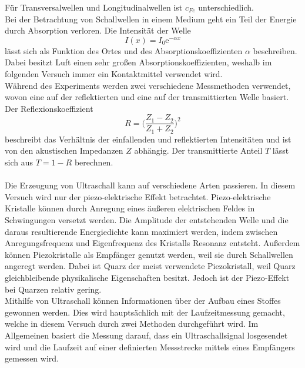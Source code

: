 Für Transversalwellen und Longitudinalwellen ist $c_{Fe}$ unterschiedlich.\\
Bei der Betrachtung von Schallwellen in einem Medium geht ein Teil der Energie durch Absorption verloren.
Die Intensität der Welle 
\begin{equation}
    I(x) = I_0 \text{e}^{-\alpha x}
    \label{eqn:Intensi}
\end{equation}
lässt sich als Funktion des Ortes und des Absorptionskoeffizienten $\alpha$ beschreiben. Dabei besitzt Luft einen sehr großen Absorptionskoeffizienten,
weshalb im folgenden Versuch immer ein Kontaktmittel verwendet wird.\\
Während des Experiments werden zwei verschiedene Messmethoden verwendet, wovon eine auf der reflektierten und eine auf der transmittierten Welle basiert.
Der Reflexionskoeffizient 
\begin{equation}
    R = \bigl(\frac{Z_1-Z_2}{Z_1+Z_2}\bigr)^2
\end{equation}
beschreibt das Verhältnis der einfallenden und reflektierten Intensitäten und ist von den akustischen Impedanzen $Z$ abhängig.
Der transmittierte Anteil $T$ lässt sich aus $T = 1 - R$ berechnen.\\
\\
Die Erzeugung von Ultraschall kann auf verschiedene Arten passieren. In diesem Versuch wird nur der piezo-elektrische Effekt betrachtet.
Piezo-elektrische Kristalle können durch Anregung eines äußeren elektrischen Feldes in Schwingungen versetzt werden.
Die Amplitude der entstehenden Welle und die daraus resultierende Energiedichte kann maximiert werden, indem zwischen Anregungsfrequenz und Eigenfrequenz
des Kristalls Resonanz entsteht.
Außerdem können Piezokristalle als Empfänger genutzt werden, weil sie durch Schallwellen angeregt werden.
Dabei ist Quarz der meist verwendete Piezokristall, weil Quarz gleichbleibende physikalische Eigenschaften besitzt.
Jedoch ist der Piezo-Effekt bei Quarzen relativ gering.\\
Mithilfe von Ultraschall können Informationen über der Aufbau eines Stoffes gewonnen werden. Dies wird hauptsächlich mit der Laufzeitmessung gemacht,
welche in diesem Versuch durch zwei Methoden durchgeführt wird. Im Allgemeinen basiert die Messung darauf, dass ein Ultraschallsignal 
losgesendet wird und die Laufzeit auf einer definierten Messstrecke mittels eines Empfängers gemessen wird.\\
